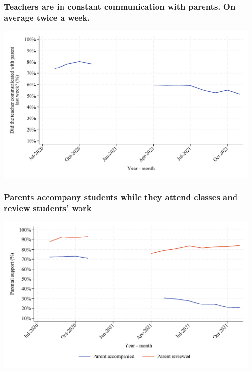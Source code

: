 \documentclass{beamer}
\begin{document}
\begin{frame}
    \label{frame:teacher_com}
    \frametitle{Teachers are in constant communication with parents. On average twice a week.}
               \includegraphics[width=\textwidth]{./FIGURES/Descriptive/SER_teacher_com_elm.pdf}    
    
\end{frame}

\begin{frame}
    \label{frame:parental_support}
    \frametitle{Parents accompany students while they attend classes and review students' work}
               \includegraphics[width=\textwidth]{./FIGURES/Descriptive/SER_parent_elm.pdf}    
    
\end{frame}
\end{document}
